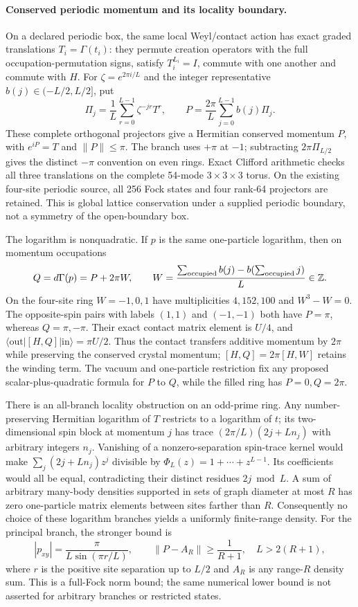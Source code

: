 \paragraph{Conserved periodic momentum and its locality boundary.}
On a declared periodic box, the same local Weyl/contact action has exact
graded translations $T_i=\Gamma(t_i)$: they permute creation operators with
the full occupation-permutation signs, satisfy $T_i^{L_i}=I$, commute with
one another and commute with $H$.  For
$\zeta=e^{2\pi i/L}$ and the integer representative
$b(j)\in(-L/2,L/2]$, put
\[
 \Pi_j=\frac1L\sum_{r=0}^{L-1}\zeta^{-jr}T^r,
 \qquad P=\frac{2\pi}{L}\sum_{j=0}^{L-1}b(j)\Pi_j.
\]
These complete orthogonal projectors give a Hermitian conserved momentum
$P$, with $e^{iP}=T$ and $\|P\|\leq\pi$.  The branch uses $+\pi$ at $-1$;
subtracting $2\pi\Pi_{L/2}$ gives the distinct $-\pi$ convention on even
rings.  Exact Clifford arithmetic checks all three translations on the
complete 54-mode $3\times3\times3$ torus.  On the existing four-site
periodic source, all 256 Fock states and four rank-64 projectors are retained.
This is global lattice conservation under a supplied periodic boundary,
not a symmetry of the open-boundary box.

The logarithm is nonquadratic.  If $p$ is the same one-particle logarithm,
then on momentum occupations
\[
 Q=d\Gamma(p)=P+2\pi W,
 \qquad W=\frac{\sum_{\rm occupied}b(j)-b(\sum_{\rm occupied}j)}L\in\mathbb Z.
\]
On the four-site ring $W=-1,0,1$ have multiplicities $4,152,100$ and
$W^3-W=0$.  The opposite-spin pairs with labels $(1,1)$ and $(-1,-1)$
both have $P=\pi$, whereas $Q=\pi,-\pi$.  Their exact contact matrix
element is $U/4$, and
$\langle\mathrm{out}|[H,Q]|\mathrm{in}\rangle=\pi U/2$.
Thus the contact transfers additive momentum by $2\pi$ while preserving
the conserved crystal momentum; $[H,Q]=2\pi[H,W]$ retains the winding term.
The vacuum and one-particle restriction fix any proposed scalar-plus-quadratic
formula for $P$ to $Q$, while the filled ring has $P=0,Q=2\pi$.

There is an all-branch locality obstruction on an odd-prime ring.
Any number-preserving Hermitian logarithm of $T$ restricts to a logarithm
of $t$; its two-dimensional spin block at momentum $j$ has trace
$(2\pi/L)(2j+Ln_j)$ with arbitrary integers $n_j$.  Vanishing of a
nonzero-separation spin-trace kernel would make
$\sum_j(2j+Ln_j)z^j$ divisible by
$\Phi_L(z)=1+\cdots+z^{L-1}$.  Its coefficients would all be equal,
contradicting their distinct residues $2j\bmod L$.  A sum of arbitrary
many-body densities supported in sets of graph diameter at most $R$ has
zero one-particle matrix elements between sites farther than $R$.
Consequently no choice of these logarithm branches yields a uniformly
finite-range density.  For the principal branch, the stronger bound is
\[
 |p_{xy}|=\frac{\pi}{L\sin(\pi r/L)},\qquad
 \|P-A_R\|\geq\frac1{R+1},\quad L>2(R+1),
\]
where $r$ is the positive site separation up to $L/2$ and $A_R$ is any
range-$R$ density sum.  This is a full-Fock norm bound; the same numerical
lower bound is not asserted for arbitrary branches or restricted states.

